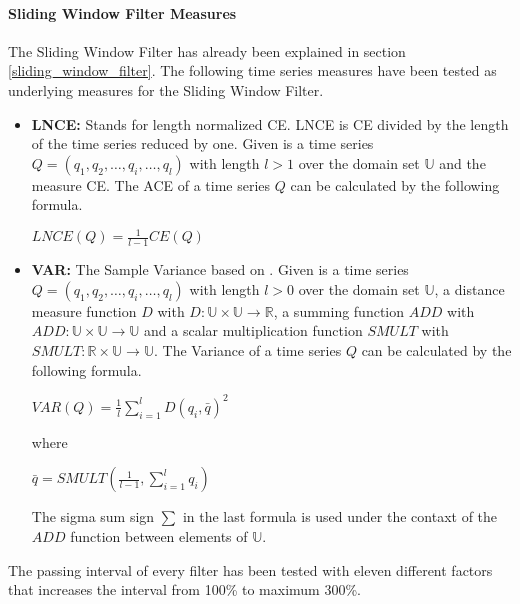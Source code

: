 \paragraph{Sliding Window Filter Measures} \label{sliding_window_filter_measures}
The Sliding Window Filter has already been explained in section \ref{sliding_window_filter}. The following time series
measures have been tested as underlying measures for the Sliding Window Filter.

\begin{itemize}
    \item \textbf{LNCE:} Stands for length normalized CE. LNCE is CE divided by the length of the time series reduced by
    one. Given is a time series $Q = (q_1, q_2, \dots, q_i, \dots, q_l)$ with length $l > 1$ over the domain set
    $\mathbb{U}$ and the measure CE. The ACE of a time series $Q$ can be calculated by the following formula.
    \begin{center}
        $LNCE(Q) = \frac{1}{l - 1}CE(Q)$
    \end{center}
    \item \textbf{VAR:} The Sample Variance based on \cite{chan1983algorithms}. Given is a time series
    $Q = (q_1, q_2, \dots, q_i, \dots, q_l)$ with length $l > 0$ over the domain set $\mathbb{U}$, a distance measure
    function $D$ with $D: \mathbb{U} \times \mathbb{U} \to \mathbb{R}$, a summing function $ADD$ with
    $ADD: \mathbb{U} \times \mathbb{U} \to \mathbb{U}$ and a scalar multiplication function $SMULT$ with
    $SMULT: \mathbb{R} \times \mathbb{U} \to \mathbb{U}$. The Variance of a time series $Q$ can be calculated by the
    following formula.
    \begin{center}
        $VAR(Q) = \frac{1}{l}\sum \limits_{i=1}^{l} D(q_i, \bar{q})^2$
    \end{center}
    where
    \begin{center}
        $\bar{q} = SMULT(\frac{1}{l-1}, \sum \limits_{i=1}^{l} q_i)$
    \end{center}
    The sigma sum sign $\sum$ in the last formula is used under the contaxt of the $ADD$ function between elements of
    $\mathbb{U}$.
\end{itemize}
The passing interval of every filter has been tested with eleven different factors that increases the interval from
100\% to maximum 300\%.
